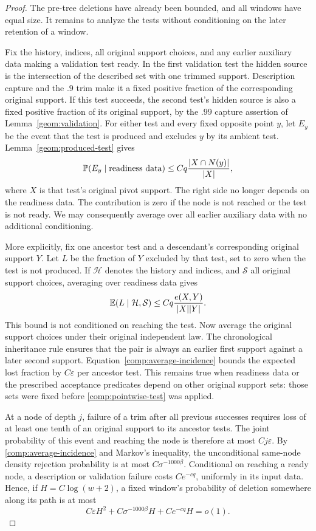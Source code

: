 \begin{proof}
The pre-tree deletions have already been bounded, and all
windows have equal size. It remains to analyze the tests
without conditioning on the later retention of a window.

Fix the history, indices, all original support choices,
and any earlier auxiliary data making a validation test
ready. In the first validation test the hidden source is
the intersection of the described set with one trimmed
support. Description capture and the \(.9\) trim make it
a fixed positive fraction of the corresponding original
support. If this test succeeds, the second test's hidden
source is also a fixed positive fraction of its original
support, by the \(.99\) capture assertion of
Lemma~\ref{geom:validation}.
For either test and every fixed opposite point \(y\), let
\(E_y\) be the event that the test is produced and excludes
\(y\) by its ambient test.
Lemma~\ref{geom:produced-test} gives
\begin{equation}\label{comp:pointwise-test}
 \mathbb P(E_y\mid\text{readiness data})
       \le Cq\frac{|X\cap N(y)|}{|X|},
\end{equation}
where \(X\) is that test's original pivot support.
The right side no longer depends on the readiness data.
The contribution is zero if the node is not reached or
the test is not ready. We may consequently average over
all earlier auxiliary data with no additional conditioning.

More explicitly, fix one ancestor test and a descendant's
corresponding original support \(Y\). Let \(L\) be the
fraction of \(Y\) excluded by that test, set to zero when
the test is not produced. If \(\mathcal H\) denotes the
history and indices, and \(\mathcal S\) all original support
choices, averaging over readiness data gives
\[
 \mathbb E(L\mid\mathcal H,\mathcal S)
       \le Cq\frac{e(X,Y)}{|X||Y|}.
\]
This bound is not conditioned on reaching the test.
Now average the original support choices under their
original independent law.
The chronological inheritance rule ensures that the pair
is always an earlier first support against a later second
support. Equation~\eqref{comp:average-incidence} bounds the
expected lost fraction by \(C\varepsilon\) per ancestor
test. This remains true when readiness data or the
prescribed acceptance predicates depend on other original
support sets: those sets were fixed before
\eqref{comp:pointwise-test} was applied.

At a node of depth \(j\), failure of a trim after all
previous successes requires loss of at least one tenth
of an original support to its ancestor tests. The joint
probability of this event and reaching the node is
therefore at most \(Cj\varepsilon\).
By \eqref{comp:average-incidence} and Markov's inequality,
the unconditional same-node density rejection probability
is at most \(C\sigma^{-1000\beta}\).
Conditional on reaching a ready node, a description or
validation failure costs \(Ce^{-cq}\), uniformly in its
input data. Hence, if \(H=C\log(w+2)\), a fixed window's
probability of deletion somewhere along its path is at
most
\begin{equation}\label{comp:subtree-loss}
 C\varepsilon H^2+
 C\sigma^{-1000\beta}H+Ce^{-cq}H=o(1).
\end{equation}


\end{proof}
